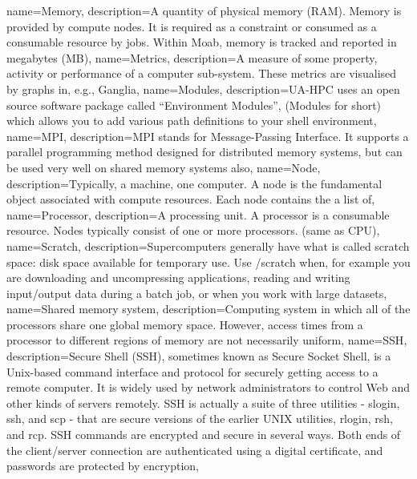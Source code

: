 {
  name={Memory},
  description={A quantity of physical memory (RAM). Memory is provided by compute nodes. It is required as a constraint or consumed as a consumable resource by jobs. Within Moab, memory is tracked and reported in megabytes (MB)},
}
{
  name={Metrics},
  description={A measure of some property, activity or performance of a computer sub-system. These metrics are visualised by graphs in, e.g., Ganglia},
}
{
  name={Modules},
  description={UA-HPC uses an open source software package called ``Environment Modules'', (Modules for short) which allows you to add various path definitions to your shell environment},
}
{
  name={MPI},
  description={MPI stands for Message-Passing Interface. It supports a parallel programming method designed for distributed memory systems, but can be used very well on shared memory systems also},
}
{
  name={Node},
  description={Typically, a machine, one computer. A node is the fundamental object associated with compute resources. Each node contains the a list of},
}
{
  name={Processor},
  description={A processing unit. A processor is a consumable resource. Nodes typically consist of one or more processors. (same as CPU)},
}
{
  name={Scratch},
  description={Supercomputers generally have what is called scratch space: disk space available for temporary use. Use /scratch when, for example you are downloading and uncompressing applications, reading and writing input/output data during a batch job, or when you work with large datasets},
}
{
  name={Shared memory system},
  description={Computing system in which all of the processors share one global memory space. However, access times from a processor to different regions of memory are not necessarily uniform},
}
{
  name={SSH},
  description={Secure Shell (SSH), sometimes known as Secure Socket Shell, is a Unix-based command interface and protocol for securely getting access to a remote computer. It is widely used by network administrators to control Web and other kinds of servers remotely. SSH is actually a suite of three utilities - slogin, ssh, and scp - that are secure versions of the earlier UNIX utilities, rlogin, rsh, and rcp. SSH commands are encrypted and secure in several ways. Both ends of the client/server connection are authenticated using a digital certificate, and passwords are protected by encryption},
}
